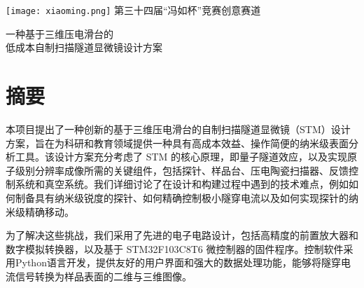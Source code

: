 \documentclass{article}
\def\Fengrubei{第三十四届“冯如杯”竞赛创意赛道}
\begin{document}
\begin{titlepage}
	\vspace{32pt}
	\begin{center}
		\texttt{[image: xiaoming.png]}
		\vskip 6pt
		\xiaoer
		\zhongsong
		\Fengrubei{}
	\end{center}
	\vspace{12pt}
	\begin{spacing}{3}
		\begin{center}
			\erhao
			\zhongsong
			一种基于三维压电滑台的\\低成本自制扫描隧道显微镜设计方案
		\end{center}
	\end{spacing}
	
\end{titlepage}



\clearpage
\renewcommand{\headrulewidth}{0pt}	%

\xiaosi	%


\section*{摘要}
本项目提出了一种创新的基于三维压电滑台的自制扫描隧道显微镜（STM）设计方案，旨在为科研和教育领域提供一种具有高成本效益、操作简便的纳米级表面分析工具。该设计方案充分考虑了 STM 的核心原理，即量子隧道效应，以及实现原子级别分辨率成像所需的关键组件，包括探针、样品台、压电陶瓷扫描器、反馈控制系统和真空系统。我们详细讨论了在设计和构建过程中遇到的技术难点，例如如何制备具有纳米级锐度的探针、如何精确控制极小隧穿电流以及如何实现探针的纳米级精确移动。

为了解决这些挑战，我们采用了先进的电子电路设计，包括高精度的前置放大器和数字模拟转换器，以及基于 STM32F103C8T6 微控制器的固件程序。控制软件采用Python语言开发，提供友好的用户界面和强大的数据处理功能，能够将隧穿电流信号转换为样品表面的二维与三维图像。
\end{document}
